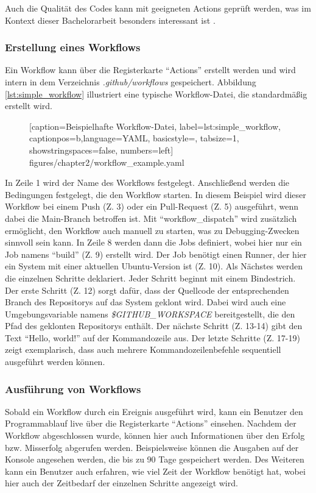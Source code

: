 Auch die Qualität des Codes kann mit geeigneten Actions geprüft werden, was im Kontext dieser Bachelorarbeit besonders interessant ist \cite[S. 1ff.]{github_action_book}.  



\subsubsection{Erstellung eines Workflows}
Ein Workflow kann über die Registerkarte \enquote{Actions} erstellt werden und wird intern in dem Verzeichnis \textit{.github/workflows} gespeichert. Abbildung \ref{lst:simple_workflow} illustriert eine typische Workflow-Datei, die standardmäßig erstellt wird.


\begin{figure}[ht!]
	
			[caption={Beispielhafte Workflow-Datei},
			label={lst:simple_workflow},
			captionpos=b,language=YAML, basicstyle=\footnotesize, tabsize=1, showstringspaces=false,  numbers=left]
			{figures/chapter2/workflow_example.yaml}
			\end{figure}
In Zeile 1 wird der Name des Workflows festgelegt. Anschließend werden die Bedingungen festgelegt, die den Workflow starten. In diesem Beispiel wird dieser Workflow bei einem Push (Z. 3) oder ein Pull-Request (Z. 5) ausgeführt, wenn dabei die Main-Branch betroffen ist. Mit \enquote{workflow\_dispatch} wird zusätzlich ermöglicht, den Workflow auch manuell zu starten, was zu Debugging-Zwecken sinnvoll sein kann. In Zeile 8 werden dann die Jobs definiert, wobei hier nur ein Job namens \enquote{build} (Z. 9) erstellt wird. Der Job benötigt einen Runner, der hier ein System mit einer aktuellen Ubuntu-Version ist (Z. 10). Als Nächstes werden die einzelnen Schritte deklariert. Jeder Schritt beginnt mit einem Bindestrich. Der erste Schritt (Z. 12) sorgt dafür, dass der Quellcode der entsprechenden Branch des Repositorys auf das System geklont wird. Dabei wird auch eine Umgebungsvariable namens \textit{\$GITHUB\_WORKSPACE} bereitgestellt, die den Pfad des geklonten Repositorys enthält. Der nächste Schritt (Z. 13-14) gibt den Text \enquote{Hello, world!} auf der Kommandozeile aus. Der letzte Schritte (Z. 17-19) zeigt exemplarisch, dass auch mehrere Kommandozeilenbefehle sequentiell ausgeführt  werden können.

\subsubsection{Ausführung von Workflows}
Sobald ein Workflow durch ein Ereignis ausgeführt wird, kann ein Benutzer den Programmablauf live über die Registerkarte \enquote{Actions} einsehen. Nachdem der Workflow abgeschlossen wurde, können hier auch Informationen über den Erfolg bzw. Misserfolg abgerufen werden. Beispielsweise können die Ausgaben auf der Konsole angesehen werden, die bis zu 90 Tage gespeichert werden.  Des Weiteren kann ein Benutzer auch erfahren, wie viel Zeit der Workflow benötigt hat, wobei hier auch der Zeitbedarf der einzelnen Schritte angezeigt wird. 


